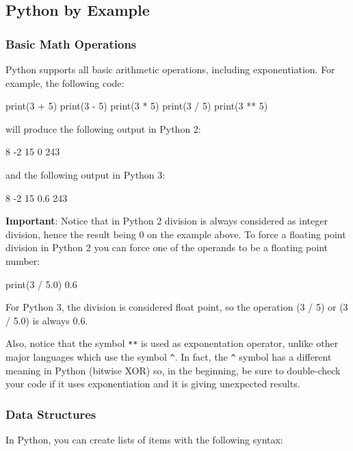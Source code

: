 
\subsection{Python by Example}

\subsubsection{Basic Math Operations}

Python supports all basic arithmetic operations, including exponentiation. For
example, the following code: \begin{python}
print(3 + 5)
print(3 - 5)
print(3 * 5)
print(3 / 5)
print(3 ** 5)
\end{python}

\noindent will produce the following output in Python 2:
\begin{python}
8
-2
15
0
243
\end{python}

\noindent and the following output in Python 3:
\begin{python}
8
-2
15
0.6
243
\end{python}

\textbf{Important}: Notice that in Python 2 division is always considered as integer division, hence the result
being 0 on the example above. To force a floating point division in Python 2 you can force
one of the operands to be a floating point number: \begin{python}
print(3 / 5.0)
0.6
\end{python}

For Python 3, the division is considered float point, so the operation (3 / 5) or (3 / 5.0) is always 0.6. 

Also, notice that the symbol \texttt{**} is used as exponentation operator, unlike other major languages which use the symbol \texttt{\^}. In fact, the \texttt{\^} symbol has a different meaning in Python (bitwise XOR) so, in the beginning, be sure to double-check your code if it uses exponentiation and it is giving unexpected results.

\subsubsection{Data Structures}

In Python, you can create lists of items with the following syntax:

